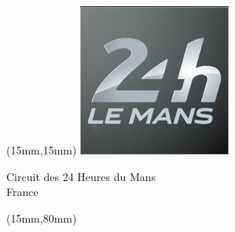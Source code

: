 \begin{textblock*}{50mm}(15mm,15mm)%
\includegraphics[width=50mm]{LG/2015-05-20_00084.png}
\par Circuit des 24 Heures du Mans\\ France
\end{textblock*}
\begin{textblock*}{185mm}(15mm,80mm)%
\end{textblock*}
